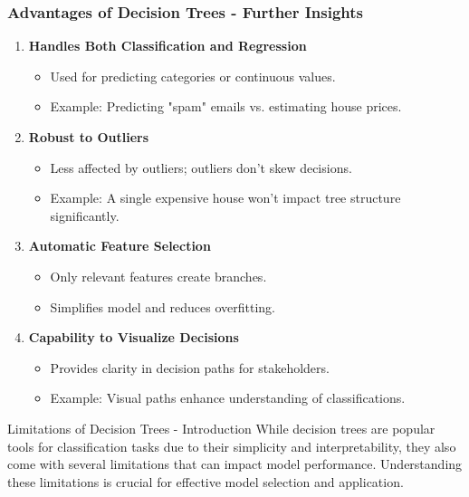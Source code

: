 \documentclass[aspectratio=169]{beamer}
\begin{document}
\begin{frame}[fragile]
    \frametitle{Advantages of Decision Trees - Further Insights}
    \begin{enumerate}[resume]
        \item \textbf{Handles Both Classification and Regression}
            \begin{itemize}
                \item Used for predicting categories or continuous values.
                \item Example: Predicting "spam" emails vs. estimating house prices.
            \end{itemize}

        \item \textbf{Robust to Outliers}
            \begin{itemize}
                \item Less affected by outliers; outliers don't skew decisions.
                \item Example: A single expensive house won’t impact tree structure significantly.
            \end{itemize}

        \item \textbf{Automatic Feature Selection}
            \begin{itemize}
                \item Only relevant features create branches.
                \item Simplifies model and reduces overfitting.
            \end{itemize}

        \item \textbf{Capability to Visualize Decisions}
            \begin{itemize}
                \item Provides clarity in decision paths for stakeholders.
                \item Example: Visual paths enhance understanding of classifications.
            \end{itemize}
    \end{enumerate}
\end{frame}

\begin{frame}[fragile]{Limitations of Decision Trees - Introduction}
  While decision trees are popular tools for classification tasks due to their simplicity and interpretability, they also come with several limitations that can impact model performance. Understanding these limitations is crucial for effective model selection and application.
\end{frame}
\end{document}
